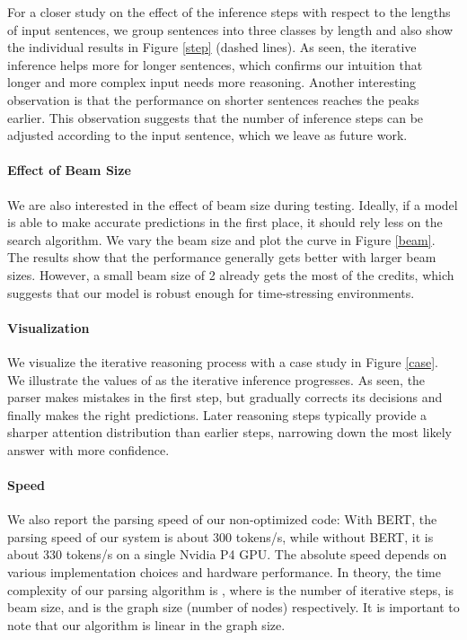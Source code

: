 \documentclass[11pt,a4paper]{article}
\begin{document}
	For a closer study on the effect of the inference steps with respect to the lengths of input sentences, we group sentences into three classes by length and also show the individual results in Figure \ref{step} (dashed lines). As seen, the iterative inference helps more for longer sentences, which confirms our intuition that longer and more complex input needs more reasoning. Another interesting observation is that the performance on shorter sentences reaches the peaks earlier. This observation suggests that the number of inference steps can be adjusted according to the input sentence, which we leave as future work.
	\paragraph{Effect of Beam Size}
	We are also interested in the effect of beam size during testing. Ideally, if a model is able to make accurate predictions in the first place, it should rely less on the search algorithm. We vary the beam size and plot the curve in Figure \ref{beam}. The results show that the performance generally gets better with larger beam sizes. However, a small beam size of 2 already gets the most of the credits, which suggests that our model is robust enough for time-stressing environments.
	\paragraph{Visualization}
	We visualize the iterative reasoning process with a case study in Figure \ref{case}. We illustrate the values of  as the iterative inference progresses. As seen, the parser makes mistakes in the first step, but gradually corrects its decisions and finally makes the right predictions. Later reasoning steps typically provide a sharper attention distribution than earlier steps, narrowing down the most likely answer with more confidence.
	\paragraph{Speed}
	We also report the parsing speed of our non-optimized code: With BERT, the parsing speed of our system is about 300 tokens/s, while without BERT, it is about 330 tokens/s on a single Nvidia P4 GPU. The absolute speed depends on various implementation choices and hardware performance. In theory, the time complexity of our parsing algorithm is , where  is the number of iterative steps,  is beam size, and  is the graph size (number of nodes) respectively. It is important to note that our algorithm is linear in the graph size.
\end{document}
